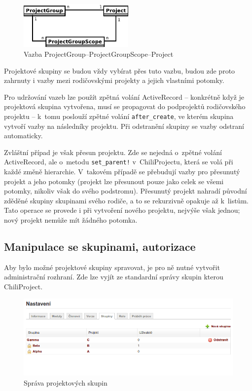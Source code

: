 \documentclass[thesis=B,czech]{FITthesis}[2012/05/02]
\begin{document}
\begin{figure}[htbp]
\centering
\includegraphics[width=0.5\textwidth]{group-er4.pdf}
\caption{Vazba ProjectGroup--ProjectGroupScope--Project}
\end{figure}

Projektové skupiny se budou vždy vybírat přes tuto vazbu, budou zde
proto zahrnuty i vazby mezi rodičovskými projekty a jejich vlastními
potomky.

Pro udržování vazeb lze použít zpětná volání ActiveRecord -- konkrétně
když je projektová skupina vytvořena, musí se propagovat do podprojektů
rodičovského projektu -- k~tomu poslouží zpětné volání
\lstinline!after_create!, ve kterém skupina vytvoří vazby na následníky
projektu. Při odstranění skupiny se vazby odstraní automaticky.

Zvláštní případ je však přesun projektu. Zde se nejedná o~zpětné volání
ActiveRecord, ale o~metodu \lstinline"set_parent!" v~ChiliProjectu,
která se volá při každé změně hierarchie. V~takovém případě se přebudují
vazby pro přesunutý projekt a jeho potomky (projekt lze přesunout pouze
jako celek se všemi potomky, nikoliv však do svého podstromu). Přesunutý
projekt nahradí původní zděděné skupiny skupinami svého rodiče, a to se
rekurzivně opakuje až k~listům.
Tato operace se provede i při vytvoření nového projektu, nejvýše však
jednou; nový projekt nemůže mít žádného potomka.

\subsection{Manipulace se skupinami, autorizace}

Aby bylo možné projektové skupiny spravovat, je pro ně nutné vytvořit
administrační rozhraní. Zde lze vyjít ze standardní správy skupin kterou
ChiliProject.

\begin{figure}[tbp]
\centering
\includegraphics[width=1\textwidth]{group-gui1.png}
\caption{Správa projektových skupin}
\end{figure}
\end{document}
